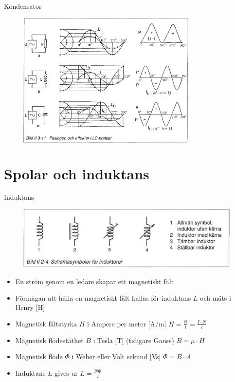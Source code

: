 \documentclass{beamer}
\begin{document}
\begin{frame}{Kondensator}

\begin{figure}[h]
\includegraphics[width=0.8\textwidth]{images/bild_2_3-11}
\end{figure}

\end{frame}

\section{Spolar och induktans}

\begin{frame}{Induktans}

\begin{figure}[h]
\includegraphics[width=\textwidth]{images/bild_2_2-04}
\end{figure}

\begin{itemize}
  \item En ström genom en ledare skapar ett magnetiskt fält
  \item Förmågan att hålla en magnetiskt fält kallas för induktans $L$ och mäts i Henry [H]
  \item Magnetisk fältstyrka $H$ i Ampere per meter [A/m] $H=\frac{\Theta}{l} = \frac{I \cdot N}{l}$
  \item Magnetisk flödestäthet $B$ i Tesla [T] (tidigare Gauss) $B = \mu \cdot H$
  \item Magnetisk flöde $\Phi$ i Weber eller Volt sekund [Vs] $\Phi = B \cdot A$
  \item Induktans $L$ gives ur $L=\frac{N\Phi}{I}$
\end{itemize}
\end{frame}
\end{document}
